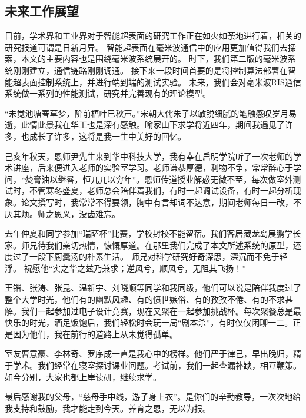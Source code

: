 \documentclass[supercite]{HustGraduPaper}
\begin{document}
\subsection{未来工作展望}

目前，学术界和工业界对于智能超表面的研究工作正在如火如荼地进行着，相关的研究报道可谓是日新月异。
智能超表面在毫米波通信中的应用更加值得我们去探索，本文的主要内容也是围绕毫米波系统展开的。
时下，我们第二版的毫米波系统刚刚建立，通信链路刚刚调通。
接下来一段时间首要的是将控制算法部署在智能超表面控制系统上，并进行端到端的测试实验。
未来，我们会对毫米波RIS通信系统做一系列的性能测试，研究并完善现有的理论模型。

\begin{thankpage}
	
	“未觉池塘春草梦，阶前梧叶已秋声。”宋朝大儒朱子以敏锐细腻的笔触感叹岁月易逝，此情此景我在华工也是深有感触。喻家山下求学将近四年，期间我遇见了许多，也成长了许多，这将是我一生中美好的回忆。

	己亥年秋天，恩师尹先生来到华中科技大学，我有幸在启明学院听了一次老师的学术讲座，后来便进入老师的实验室学习。老师谦恭厚德，利物不争，常常醉心于学问，“焚膏油以继晷，恒兀兀以穷年”。恩师传道授业解惑无微不至，每次做室外测试时，不管寒冬盛夏，老师总会陪伴着我们，有时一起调试设备，有时一起分析现象。论文撰写时，我常常不得要领，胸中有言却词不达意，期间老师每日一改，不厌其烦。师之恩义，没齿难忘。

	去年仲夏和同学参加“瑞萨杯”比赛，学校封校不能留宿。我们客居藏龙岛展鹏学长家。师兄待我们亲切热情，慷慨厚道。在那里我们完成了本文所述系统的原型，还度过了一段下厨羹汤的朴素生活。
	师兄对科学研究好奇深思，深沉而不免于轻浮。
	祝愿他“实之华之兹乃兼求；逆风兮，顺风兮，无阻其飞扬！”

	王锴、张涛、张昆、温新宇、刘晓顺等同学和我同级，他们可以说是陪伴我度过了整个大学时光，他们有的幽默风趣、有的愤世嫉俗、有的孜孜不倦、有的不求甚解。我们一起参加过电子设计竞赛，现在又聚在一起参加挑战杯。每次聚餐总是最快乐的时光，酒足饭饱后，我们轻松时会玩一局“剧本杀”，有时仅仅闲聊一二。正是因为他们，我在前行的道路上从未觉得孤单。

	室友曹意豪、李林奇、罗序成一直是我心中的榜样。他们严于律己，早出晚归，精于学术。我们经常在寝室探讨课业问题。考试前，我们一起查漏补缺，相互鞭策。如今分别，大家也都上岸读研，继续求学。

	最后感谢我的父母，“慈母手中线，游子身上衣”。是你们的辛勤教导，一次次地给我支持和鼓励，我才能走到今天。养育之恩，无以为报。


	

\end{thankpage}
\end{document}
